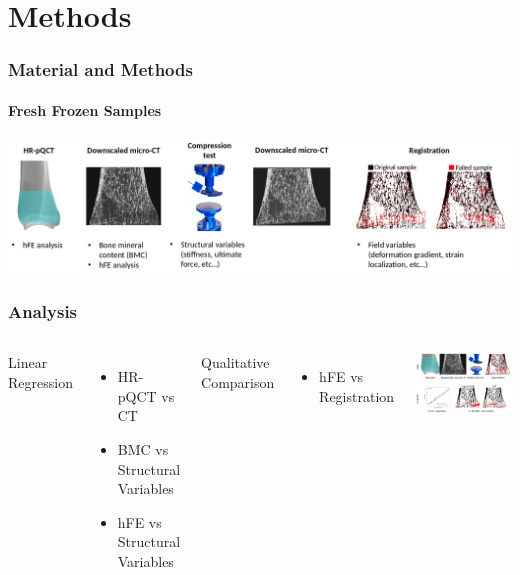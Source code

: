 \documentclass[xcolor=table,11pt]{beamer}
\begin{document}
	
	\section{Methods}

	\begin{frame}
		\frametitle{Material and Methods}
		\framesubtitle{Fresh Frozen Samples}
		\centering
		\includegraphics[width=1.0\linewidth]{Figures/MethodsFull1}
	\end{frame}

	\begin{frame}
		\frametitle{Analysis}
		\begin{columns}
			\column{0.5\linewidth}
			Linear Regression
			\begin{itemize}
				\item HR-pQCT vs \textmu CT
				\item BMC vs Structural Variables
				\item hFE vs Structural Variables
			\end{itemize}
			\vspace{5mm}
			Qualitative Comparison
			\begin{itemize}
				\item hFE vs Registration
			\end{itemize}

			\column{0.5\linewidth}
			\centering
			\includegraphics[width=1.0\linewidth, trim=20 0 20 0]{Figures/MethodsFull2a}\\
			\vspace{5mm}
			\includegraphics[width=1.0\linewidth, trim=20 0 20 0]{Figures/MethodsFull2b}
		\end{columns}

	\end{frame}
\end{document}
